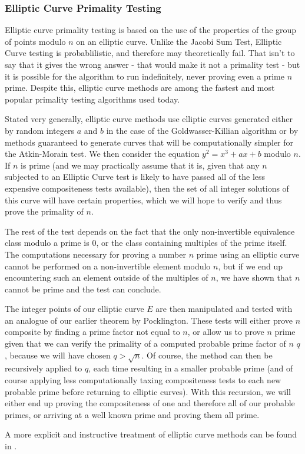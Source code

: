 \documentclass{article}
\begin{document}
\subsubsection*{Elliptic Curve Primality Testing}

Elliptic curve primality testing is based on the use of the properties of the group of points modulo $n$ on an elliptic curve. Unlike the Jacobi Sum Test, Elliptic Curve testing is probablilistic, and therefore may theoretically fail. That isn't to say that it gives the wrong answer - that would make it not a primality test - but it is possible for the algorithm to run indefinitely, never proving even a prime $n$ prime.  Despite this, elliptic curve methods are among the fastest and most popular primality testing algorithms used today.
\par Stated very generally, elliptic curve methods use elliptic curves generated either by random integers $a$ and $b$ in the case of the Goldwasser-Killian algorithm or by methods guaranteed to generate curves that will be computationally simpler for the Atkin-Morain test. We then consider the equation $y^2 = x^3 + ax + b$ modulo $n$. If $n$ is prime (and we may practically assume that it is, given that any $n$ subjected to an Elliptic Curve test is likely to have passed all of the less expensive compositeness tests available), then the set of all integer solutions of this curve will have certain properties, which we will hope to verify and thus prove the primality of $n$.
\par The rest of the test depends on the fact that the only non-invertible equivalence class modulo a prime is $0$, or the class containing multiples of the prime itself. The computations necessary for proving a number $n$ prime using an elliptic curve cannot be performed on a non-invertible element modulo $n$,  but if we end up encountering such an element outside of the multiples of $n$, we have shown that $n$ cannot be prime and the test can conclude. 
\par The integer points of our elliptic curve $E$ are then manipulated and tested with an analogue of our earlier theorem by Pocklington. These tests will either prove $n$ composite by finding a prime factor not equal to $n$, or allow us to prove $n$ prime given that we can verify the primality of a computed probable prime factor of $n$ $q$, because we will have chosen $q > \sqrt{n}$. Of course, the method can then be recursively applied to $q$, each time resulting in a smaller probable prime (and of course applying less computationally taxing compositeness tests to each new probable prime before returning to elliptic curves). With this recursion, we will either end up proving the compositeness of one and therefore all of our probable primes, or arriving at a well known prime and proving them all prime. 
\par A more explicit and instructive treatment of elliptic curve methods can be found in \citep{koblitz}.
\end{document}
